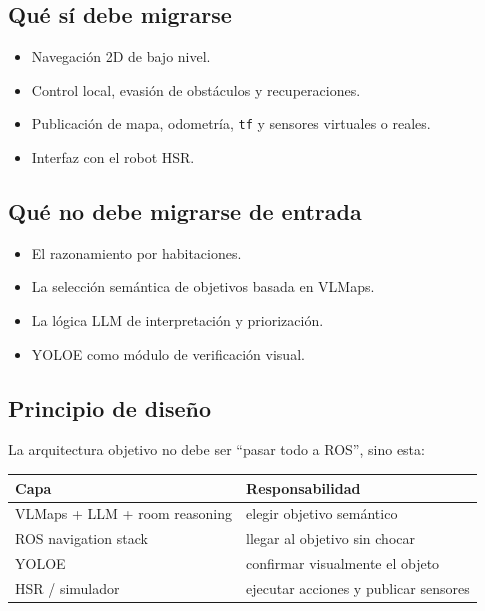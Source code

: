 \documentclass[11pt,a4paper]{article}
\begin{document}
\subsection{Qué sí debe migrarse}

\begin{itemize}
  \item Navegación 2D de bajo nivel.
  \item Control local, evasión de obstáculos y recuperaciones.
  \item Publicación de mapa, odometría, \texttt{tf} y sensores virtuales o reales.
  \item Interfaz con el robot HSR.
\end{itemize}

\subsection{Qué no debe migrarse de entrada}

\begin{itemize}
  \item El razonamiento por habitaciones.
  \item La selección semántica de objetivos basada en VLMaps.
  \item La lógica LLM de interpretación y priorización.
  \item YOLOE como módulo de verificación visual.
\end{itemize}

\subsection{Principio de diseño}

La arquitectura objetivo no debe ser ``pasar todo a ROS'', sino esta:

\begin{center}
\begin{tabular}{ll}
\toprule
\textbf{Capa} & \textbf{Responsabilidad} \\
\midrule
VLMaps + LLM + room reasoning & elegir objetivo semántico \\
ROS navigation stack & llegar al objetivo sin chocar \\
YOLOE & confirmar visualmente el objeto \\
HSR / simulador & ejecutar acciones y publicar sensores \\
\bottomrule
\end{tabular}
\end{center}
\end{document}

